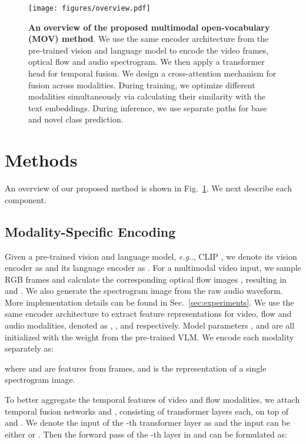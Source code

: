 \documentclass{article}
\makeatletter
\DeclareRobustCommand\onedot{\futurelet\@let@token\@onedot}
\def\@onedot{\ifx\@let@token.\else.\null\fi\xspace}
\def\eg{\emph{e.g}\onedot} \def\Eg{\emph{E.g}\onedot}
\makeatother
\begin{document}
\begin{figure}[t]
\centering
\texttt{[image: figures/overview.pdf]}
\caption{\textbf{An overview of the proposed multimodal open-vocabulary (MOV) method}. We use the same encoder architecture from the pre-trained vision and language model to encode the video frames, optical flow and audio spectrogram. We then apply a transformer head for temporal fusion. We design a cross-attention mechanism for fusion across modalities. During training, we optimize different modalities simultaneously via calculating their similarity with the text embeddings. During inference, we use separate paths for base and novel class prediction.}
\label{fig:network}
\end{figure}


\section{Methods}
\label{sec:methods}
An overview of our proposed method is shown in Fig.~\ref{fig:network}. We next describe each component.

\subsection{Modality-Specific Encoding}
\label{subsec:mod_encoding}
Given a pre-trained vision and language model, \eg, CLIP \cite{radford2021learning}, we denote its vision encoder as  and its language encoder as . 
For a multimodal video input, we sample  RGB frames  and calculate the corresponding optical flow images , resulting in  and . 
We also generate the spectrogram image  from the raw audio waveform. More implementation details can be found in Sec.~\ref{sec:experiments}. 
We use the same encoder architecture  to extract feature representations for video, flow and audio modalities, denoted as , , and  respectively. 
Model parameters ,  and  are all initialized with the weight  from the pre-trained VLM. We encode each modality separately as:

where  and  are features from  frames, and  is the representation of a single spectrogram image. 

To better aggregate the temporal features of video and flow modalities, we attach temporal fusion networks  and , consisting of  transformer layers each, on top of  and . We denote the input of the -th transformer layer as  and the input  can be either  or . 
Then the forward pass of the -th layer in  and  can be formulated as:
\end{document}
